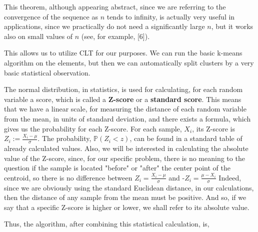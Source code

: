 \documentclass[12pt]{article}
\begin{document}
This theorem, although appearing abstract, since we are referring to the convergence of the sequence 
as $n$ tends to infinity, is actually very useful in applications, since we practically do not need a significantly large $n$, but it works also on small values of $n$ (see, for example, [6]).

This allows us to utilize CLT for our purposes. We can run the basic k-means algorithm on the elements, but then we can automatically split clusters by a very basic statistical observation.

The normal distribution, in statistics, is used for calculating, for each random variable a score, which is called a \textbf{Z-score} or a \textbf{standard score}. This means that we have a linear scale, for measuring the distance of each random variable from the mean, in units of standard deviation, and there exists a formula, which gives us the probability for each Z-score.
For each sample, $X_i$, its Z-score is $Z_i:=\frac{X_i-\mu}{\sigma}$. The probability, $\mathbb{P}(Z_i < z)$, can be found in a standard table of already calculated values. \newline
Also, we will be interested in calculating the absolute value of the Z-score, since, for our specific problem, there is no meaning to the question if the sample is located "before" or "after" the center point of the centroid, so there is no difference between $Z_i=\frac{X_i-\mu}{\sigma}$ and -$Z_i=\frac{\mu-X_i}{\sigma}$ \newline
Indeed, since we are obviously using the standard Euclidean distance, in our calculations, then the distance of any sample from the mean must be positive.
\newline
And so, if we say that a specific Z-score is higher or lower, we shall refer to its absolute value. \newline

Thus, the algorithm, after combining this statistical calculation, is,
\end{document}
